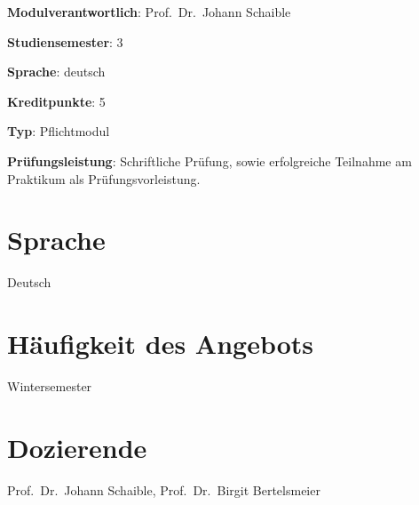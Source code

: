 \begin{modulHead}
\textbf{Modulverantwortlich}: Prof.~Dr.~Johann
Schaible
\end{modulHead}
\begin{modulHead}
\textbf{Studiensemester}:
3
\end{modulHead}
\begin{modulHead}
\textbf{Sprache}:
deutsch
\end{modulHead}
\begin{modulHead}
\textbf{Kreditpunkte}:
5
\end{modulHead}
\begin{modulHead}
\textbf{Typ}:
Pflichtmodul
\end{modulHead}
\begin{modulHead}
\textbf{Prüfungsleistung}:
Schriftliche Prüfung, sowie erfolgreiche Teilnahme am Praktikum als
Prüfungsvorleistung.
\end{modulHead}


\hypertarget{sprachepathlabel....srcmodulbeschreibungen-bachelor-bpo5ba_datenbanksysteme}{%
\section*{Sprache\label{../../src/modulbeschreibungen-bachelor-bpo5/BA_Datenbanksysteme}}\label{sprachepathlabel....srcmodulbeschreibungen-bachelor-bpo5ba_datenbanksysteme}}

Deutsch

\hypertarget{huxe4ufigkeit-des-angebotspathlabel....srcmodulbeschreibungen-bachelor-bpo5ba_datenbanksysteme}{%
\section*{Häufigkeit des
Angebots\label{../../src/modulbeschreibungen-bachelor-bpo5/BA_Datenbanksysteme}}\label{huxe4ufigkeit-des-angebotspathlabel....srcmodulbeschreibungen-bachelor-bpo5ba_datenbanksysteme}}

Wintersemester

\hypertarget{dozierendepathlabel....srcmodulbeschreibungen-bachelor-bpo5ba_datenbanksysteme}{%
\section*{Dozierende\label{../../src/modulbeschreibungen-bachelor-bpo5/BA_Datenbanksysteme}}\label{dozierendepathlabel....srcmodulbeschreibungen-bachelor-bpo5ba_datenbanksysteme}}

Prof.~Dr.~Johann Schaible, Prof.~Dr.~Birgit Bertelsmeier

